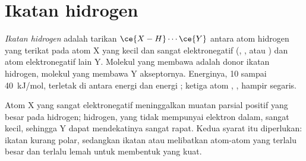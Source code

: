 \section{Ikatan hidrogen}

\begin{definition}\label{def:b1:intermolecular-forces-solvents:hbond}
\emph{Ikatan hidrogen} adalah tarikan
$\ce{X-H}\cdots\ce{Y}$ antara atom hidrogen yang terikat pada atom X yang
kecil dan sangat elektronegatif (, , atau ) dan
 atom elektronegatif lain Y. Molekul yang membawa
 adalah donor ikatan hidrogen, molekul yang membawa Y
akseptornya. Energinya, 10 sampai \qty{40}{kJ/mol}, terletak di antara
energi  dan energi ; ketiga atom
, ,  hampir segaris.
\end{definition}

\begin{remark}\label{rem:b1:intermolecular-forces-solvents:why}
Atom X yang sangat elektronegatif meninggalkan muatan parsial positif
yang besar pada hidrogen; hidrogen, yang tidak mempunyai elektron dalam,
sangat kecil, sehingga  Y dapat mendekatinya
sangat rapat. Kedua syarat itu diperlukan: ikatan  kurang polar,
sedangkan ikatan  atau  melibatkan atom-atom yang
terlalu besar dan terlalu lemah  untuk membentuk
 yang kuat.
\end{remark}

